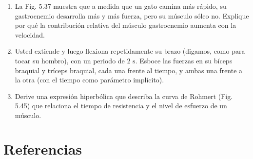 \documentclass[12pt]{book}
\begin{document}
\begin{enumerate}
\item[5.43] La Fig. 5.37 muestra que a medida que un gato camina más rápido, su gastrocnemio desarrolla más y más fuerza, pero su músculo sóleo no. Explique por qué la contribución relativa del músculo gastrocnemio aumenta con la velocidad.

\item[5.44] Usted extiende y luego flexiona repetidamente su brazo (digamos, como para tocar su hombro), con un periodo de $2\text{ s}$. Esboce las fuerzas en su bíceps braquial y tríceps braquial, cada una frente al tiempo, y ambas una frente a la otra (con el tiempo como parámetro implícito).

\item[5.45] Derive una expresión hiperbólica que describa la curva de Rohmert (Fig. 5.45) que relaciona el tiempo de resistencia y el nivel de esfuerzo de un músculo.

\end{enumerate}

\section*{Referencias}
\end{document}
